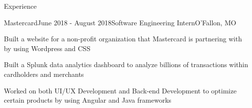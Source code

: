 \documentclass{resume} %
\begin{document}
\begin{rSection}{Experience}
\begin{rSubsection}{Mastercard}{June 2018 - August 2018}{Software Engineering Intern}{O'Fallon, MO}
\item Built a website for a non-profit organization that Mastercard is partnering with by using Wordpress and CSS
\item Built a Splunk data analytics dashboard to analyze billions of transactions within cardholders and merchants
\item Worked on both UI/UX Development and Back-end Development to optimize certain  products by using Angular and Java frameworks

\end{rSubsection}








\end{rSection}
\end{document}

